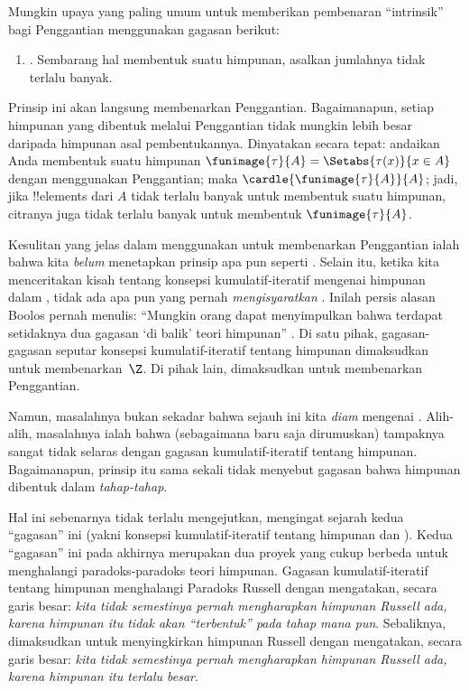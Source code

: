 \documentclass[../../../include/open-logic-section]{subfiles}
\begin{document}

Mungkin upaya yang paling umum untuk memberikan pembenaran ``intrinsik'' bagi
Penggantian menggunakan gagasan berikut:
\begin{enumerate}
	\item[] \limofsize. Sembarang hal membentuk suatu himpunan, asalkan
	jumlahnya tidak terlalu banyak.
\end{enumerate}
Prinsip ini akan langsung membenarkan Penggantian. Bagaimanapun, setiap
himpunan yang dibentuk melalui Penggantian tidak mungkin lebih besar daripada
himpunan asal pembentukannya. Dinyatakan secara tepat: andaikan Anda
membentuk suatu himpunan
$\funimage{\tau}{A} = \Setabs{\tau(x)}{x \in A}$ dengan menggunakan
Penggantian; maka $\cardle{\funimage{\tau}{A}}{A}$; jadi, jika !!{element}s
dari $A$ tidak terlalu banyak untuk membentuk suatu himpunan, citranya juga
tidak terlalu banyak untuk membentuk $\funimage{\tau}{A}$.

Kesulitan yang jelas dalam menggunakan \limofsize{} untuk membenarkan
Penggantian ialah bahwa kita \emph{belum} menetapkan prinsip apa pun seperti
\limofsize. Selain itu, ketika kita menceritakan kisah tentang konsepsi
kumulatif-iteratif mengenai himpunan dalam
, tidak ada apa pun yang pernah
\emph{mengisyaratkan} \limofsize. Inilah persis alasan Boolos pernah menulis:
``Mungkin orang dapat menyimpulkan bahwa terdapat setidaknya dua gagasan
`di balik' teori himpunan'' \citeyearpar[p.~19]{Boolos1989}. Di satu pihak,
gagasan-gagasan seputar konsepsi kumulatif-iteratif tentang himpunan
dimaksudkan untuk membenarkan~$\Z$. Di pihak lain, \limofsize{} dimaksudkan
untuk membenarkan Penggantian.

Namun, masalahnya bukan sekadar bahwa sejauh ini kita \emph{diam} mengenai
\limofsize. Alih-alih, masalahnya ialah bahwa \limofsize{} (sebagaimana baru
saja dirumuskan) tampaknya sangat tidak selaras dengan gagasan
kumulatif-iteratif tentang himpunan. Bagaimanapun, prinsip itu sama sekali
tidak menyebut gagasan bahwa himpunan dibentuk dalam \emph{tahap-tahap}.

Hal ini sebenarnya tidak terlalu mengejutkan, mengingat sejarah kedua
``gagasan'' ini (yakni konsepsi kumulatif-iteratif tentang himpunan dan
\limofsize). Kedua ``gagasan'' ini pada akhirnya merupakan dua proyek yang
cukup berbeda untuk menghalangi paradoks-paradoks teori himpunan. Gagasan
kumulatif-iteratif tentang himpunan menghalangi Paradoks Russell dengan
mengatakan, secara garis besar: \emph{kita tidak semestinya pernah
mengharapkan himpunan Russell ada, karena himpunan itu tidak akan
``terbentuk'' pada tahap mana pun}. Sebaliknya, \limofsize{} dimaksudkan
untuk menyingkirkan himpunan Russell dengan mengatakan, secara garis besar:
\emph{kita tidak semestinya pernah mengharapkan himpunan Russell ada, karena
himpunan itu terlalu besar}.
\end{document}
